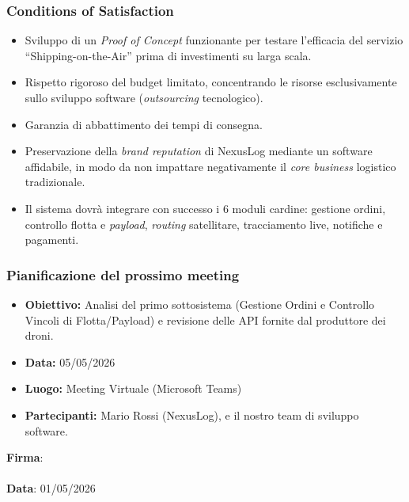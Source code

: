 \documentclass[12pt, a4paper]{article}
\begin{document}
\subsubsection*{Conditions of Satisfaction}
\begin{itemize}
    \item Sviluppo di un \textit{Proof of Concept} funzionante per testare l'efficacia del servizio ``Shipping-on-the-Air'' prima di investimenti su larga scala.
    \item Rispetto rigoroso del budget limitato, concentrando le risorse esclusivamente sullo sviluppo software (\textit{outsourcing} tecnologico).
    \item Garanzia di abbattimento dei tempi di consegna.
    \item Preservazione della \textit{brand reputation} di NexusLog mediante un software affidabile, in modo da non impattare negativamente il \textit{core business} logistico tradizionale.
    \item Il sistema dovrà integrare con successo i 6 moduli cardine: gestione ordini, controllo flotta e \textit{payload}, \textit{routing} satellitare, tracciamento live, notifiche e pagamenti.
\end{itemize}

\subsubsection*{Pianificazione del prossimo meeting}
\begin{itemize}
    \item \textbf{Obiettivo:} Analisi del primo sottosistema (Gestione Ordini e Controllo Vincoli di Flotta/Payload) e revisione delle API fornite dal produttore dei droni.
    \item \textbf{Data:} 05/05/2026
    \item \textbf{Luogo:} Meeting Virtuale (Microsoft Teams)
    \item \textbf{Partecipanti:} Mario Rossi (NexusLog), e il nostro team di sviluppo software.
\end{itemize}

\vspace{1.5cm}
\noindent
\textbf{Firma}: \hrulefill \\ \\
\textbf{Data}: 01/05/2026
\end{document}
